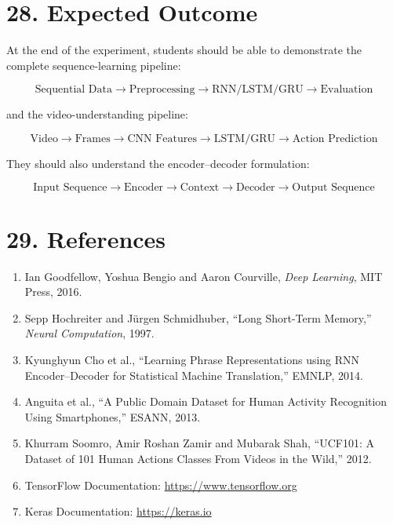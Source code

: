 \documentclass[10pt]{article}
\begin{document}
\section*{28. Expected Outcome}

At the end of the experiment, students should be able to demonstrate the
complete sequence-learning pipeline:

\[
\boxed{
\text{Sequential Data}
\rightarrow
\text{Preprocessing}
\rightarrow
\text{RNN/LSTM/GRU}
\rightarrow
\text{Evaluation}
}
\]

and the video-understanding pipeline:

\[
\boxed{
\text{Video}
\rightarrow
\text{Frames}
\rightarrow
\text{CNN Features}
\rightarrow
\text{LSTM/GRU}
\rightarrow
\text{Action Prediction}
}
\]

They should also understand the encoder--decoder formulation:

\[
\boxed{
\text{Input Sequence}
\rightarrow
\text{Encoder}
\rightarrow
\text{Context}
\rightarrow
\text{Decoder}
\rightarrow
\text{Output Sequence}
}
\]

\section*{29. References}

\begin{enumerate}
\item Ian Goodfellow, Yoshua Bengio and Aaron Courville,
\emph{Deep Learning}, MIT Press, 2016.

\item Sepp Hochreiter and Jürgen Schmidhuber,
``Long Short-Term Memory,'' \emph{Neural Computation}, 1997.

\item Kyunghyun Cho et al.,
``Learning Phrase Representations using RNN Encoder--Decoder for Statistical
Machine Translation,'' EMNLP, 2014.

\item Anguita et al.,
``A Public Domain Dataset for Human Activity Recognition Using Smartphones,''
ESANN, 2013.

\item Khurram Soomro, Amir Roshan Zamir and Mubarak Shah,
``UCF101: A Dataset of 101 Human Actions Classes From Videos in the Wild,''
2012.

\item TensorFlow Documentation:
\url{https://www.tensorflow.org}

\item Keras Documentation:
\url{https://keras.io}
\end{enumerate}
\end{document}
